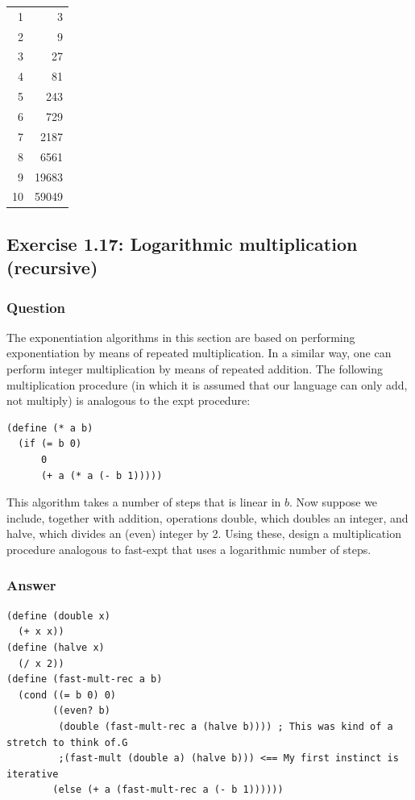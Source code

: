 \documentclass[final,fleqn,titlepage,twoside]{article}
\begin{document}
\begin{center}
\begin{tabular}{rr}
1 & 3\\[0pt]
2 & 9\\[0pt]
3 & 27\\[0pt]
4 & 81\\[0pt]
5 & 243\\[0pt]
6 & 729\\[0pt]
7 & 2187\\[0pt]
8 & 6561\\[0pt]
9 & 19683\\[0pt]
10 & 59049\\[0pt]
\end{tabular}
\end{center}

\subsection{Exercise 1.17: Logarithmic multiplication (recursive)}
\label{sec:orgff1a868}
\subsubsection{Question}
\label{sec:orgb127663}
The exponentiation algorithms in this section are based on performing
exponentiation by means of repeated multiplication. In a similar way, one can
perform integer multiplication by means of repeated addition. The following
multiplication procedure (in which it is assumed that our language can only add,
not multiply) is analogous to the expt procedure:

\begin{verbatim}
(define (* a b)
  (if (= b 0)
      0
      (+ a (* a (- b 1)))))
\end{verbatim}

This algorithm takes a number of steps that is linear in \(b\). Now suppose we
include, together with addition, operations double, which doubles an integer,
and halve, which divides an (even) integer by 2. Using these, design a
multiplication procedure analogous to fast-expt that uses a logarithmic number
of steps.

\subsubsection{Answer}
\label{sec:org608a4a4}
\begin{verbatim}
(define (double x)
  (+ x x))
(define (halve x)
  (/ x 2))
(define (fast-mult-rec a b)
  (cond ((= b 0) 0)
        ((even? b)
         (double (fast-mult-rec a (halve b)))) ; This was kind of a stretch to think of.G
         ;(fast-mult (double a) (halve b))) <== My first instinct is iterative
        (else (+ a (fast-mult-rec a (- b 1))))))
\end{verbatim}
\end{document}
